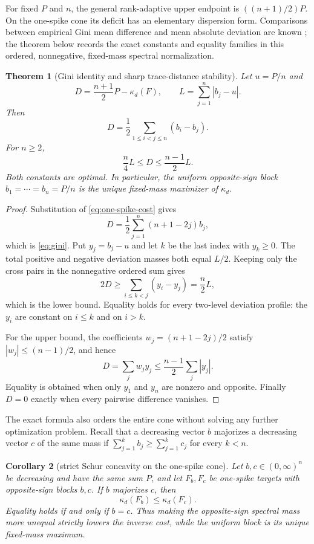 \documentclass[11pt]{article}
\newtheorem{theorem}{Theorem}[section]
\newtheorem{corollary}[theorem]{Corollary}
\theoremstyle{definition}
\theoremstyle{remark}
\newcommand{\1}{\mathbf 1}
\begin{document}
For fixed $P$ and $n$, the general rank-adaptive upper endpoint is
$((n+1)/2)P$.  On the one-spike cone its deficit has an elementary dispersion
form.  Comparisons between empirical Gini mean difference and mean absolute
deviation are known \cite{cerone2006}; the theorem below records the exact
constants and equality families in this ordered, nonnegative, fixed-mass
spectral normalization.

\begin{theorem}[Gini identity and sharp trace-distance stability]
\label{thm:stability}
Let $u=P/n$ and
\[
 D=\frac{n+1}{2}P-\kappa_d(F),
 \qquad L=\sum_{j=1}^n|b_j-u|.
\]
Then
\begin{equation}
 \boxed{\quad
 D=\frac12\sum_{1\le i<j\le n}(b_i-b_j).
 \quad}
 \label{eq:gini}
\end{equation}
For $n\ge2$,
\begin{equation}
 \boxed{\quad \frac n4L\le D\le\frac{n-1}{2}L.\quad}
 \label{eq:stability}
\end{equation}
Both constants are optimal.  In particular, the uniform opposite-sign block
$b_1=\cdots=b_n=P/n$ is the unique fixed-mass maximizer of $\kappa_d$.
\end{theorem}

\begin{proof}
Substitution of \eqref{eq:one-spike-cost} gives
\[
 D=\frac12\sum_{j=1}^n(n+1-2j)b_j,
\]
which is \eqref{eq:gini}.  Put $y_j=b_j-u$ and let $k$ be the last index with
$y_k\ge0$.  The total positive and negative deviation masses both equal
$L/2$.  Keeping only the cross pairs in the nonnegative ordered sum gives
\[
 2D\ge\sum_{i\le k<j}(y_i-y_j)=\frac n2L,
\]
which is the lower bound.  Equality holds for every two-level deviation
profile: the $y_i$ are constant on $i\le k$ and on $i>k$.

For the upper bound, the coefficients
$w_j=(n+1-2j)/2$ satisfy $|w_j|\le(n-1)/2$, and hence
\[
 D=\sum_jw_jy_j\le\frac{n-1}{2}\sum_j|y_j|.
\]
Equality is obtained when only $y_1$ and $y_n$ are nonzero and opposite.
Finally $D=0$ exactly when every pairwise difference vanishes.
\end{proof}

The exact formula also orders the entire cone without solving any further
optimization problem.  Recall that a decreasing vector $b$ majorizes a
decreasing vector $c$ of the same mass if
$\sum_{j=1}^k b_j\ge\sum_{j=1}^k c_j$ for every $k<n$.

\begin{corollary}[strict Schur concavity on the one-spike cone]
\label{cor:majorization}
Let $b,c\in(0,\infty)^n$ be decreasing and have the same sum $P$, and let
$F_b,F_c$ be one-spike targets with opposite-sign blocks $b,c$.  If $b$
majorizes $c$, then
\[
 \kappa_d(F_b)\le \kappa_d(F_c).
\]
Equality holds if and only if $b=c$.  Thus making the opposite-sign spectral
mass more unequal strictly lowers the inverse cost, while the uniform block
is its unique fixed-mass maximum.
\end{corollary}
\end{document}
